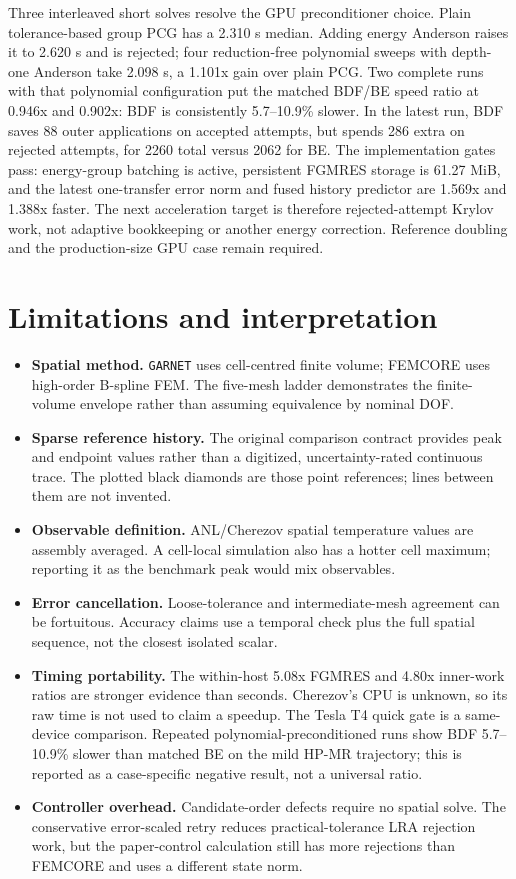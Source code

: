 \documentclass[10pt]{article}
\newcommand{\garnet}{\texttt{GARNET}}
\begin{document}
Three interleaved short solves resolve the GPU preconditioner choice. Plain
tolerance-based group PCG has a 2.310 s median. Adding energy Anderson raises
it to 2.620 s and is rejected; four reduction-free polynomial sweeps with
depth-one Anderson take 2.098 s, a 1.101x gain over plain PCG. Two complete
runs with that polynomial configuration put the matched BDF/BE speed ratio at
0.946x and 0.902x: BDF is consistently 5.7--10.9\% slower. In the latest run,
BDF saves 88 outer applications on accepted attempts, but spends 286 extra on
rejected attempts, for 2260 total versus 2062 for BE. The implementation gates
pass: energy-group batching is active, persistent FGMRES storage is 61.27 MiB,
and the latest one-transfer error norm and fused history predictor are 1.569x
and 1.388x faster. The next acceleration target is therefore rejected-attempt
Krylov work, not adaptive bookkeeping or another energy correction. Reference
doubling and the production-size GPU case remain required.

\clearpage

\section{Limitations and interpretation}

\begin{itemize}
\item \textbf{Spatial method.} \garnet{} uses cell-centred finite volume;
  FEMCORE uses high-order B-spline FEM. The five-mesh ladder demonstrates the
  finite-volume envelope rather than assuming equivalence by nominal DOF.
\item \textbf{Sparse reference history.} The original comparison contract
  provides peak and endpoint values rather than a digitized, uncertainty-rated
  continuous trace. The plotted black diamonds are those point references;
  lines between them are not invented.
\item \textbf{Observable definition.} ANL/Cherezov spatial temperature values
  are assembly averaged. A cell-local simulation also has a hotter cell
  maximum; reporting it as the benchmark peak would mix observables.
\item \textbf{Error cancellation.} Loose-tolerance and intermediate-mesh
  agreement can be fortuitous. Accuracy claims use a temporal check plus the
  full spatial sequence, not the closest isolated scalar.
\item \textbf{Timing portability.} The within-host 5.08x FGMRES and 4.80x
  inner-work ratios are stronger evidence than seconds. Cherezov's CPU is
  unknown, so its raw time is not used to claim a speedup. The Tesla T4 quick
  gate is a same-device comparison. Repeated polynomial-preconditioned runs
  show BDF 5.7--10.9\% slower than matched BE on the mild HP-MR trajectory;
  this is reported as a case-specific negative result, not a universal ratio.
\item \textbf{Controller overhead.} Candidate-order defects require no spatial
  solve. The conservative error-scaled retry reduces practical-tolerance LRA
  rejection work, but the paper-control calculation still has more rejections
  than FEMCORE and uses a different state norm.
\end{itemize}
\end{document}
